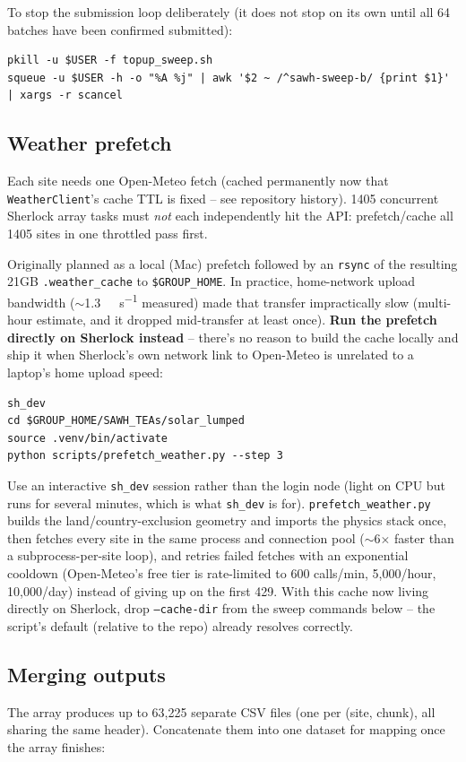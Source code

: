 \documentclass[11pt]{article}
\begin{document}
To stop the submission loop deliberately (it does not stop on its own until all 64 batches have
been confirmed submitted):
\begin{verbatim}
pkill -u $USER -f topup_sweep.sh
squeue -u $USER -h -o "%A %j" | awk '$2 ~ /^sawh-sweep-b/ {print $1}' | xargs -r scancel
\end{verbatim}

\subsection{Weather prefetch}\label{sec:weather}
Each site needs one Open-Meteo fetch (cached permanently now that \texttt{WeatherClient}'s cache
TTL is fixed -- see repository history). 1405 concurrent Sherlock array tasks must \emph{not}
each independently hit the API: prefetch/cache all 1405 sites in one throttled pass first.

Originally planned as a local (Mac) prefetch followed by an \texttt{rsync} of the resulting
21GB \texttt{.weather\_cache} to \texttt{\$GROUP\_HOME}. In practice, home-network upload
bandwidth ($\sim$\SI{1.3}{\mega\byte\per\second} measured) made that transfer impractically
slow (multi-hour estimate, and it dropped mid-transfer at least once). \textbf{Run the prefetch
directly on Sherlock instead} -- there's no reason to build the cache locally and ship it when
Sherlock's own network link to Open-Meteo is unrelated to a laptop's home upload speed:

\begin{verbatim}
sh_dev
cd $GROUP_HOME/SAWH_TEAs/solar_lumped
source .venv/bin/activate
python scripts/prefetch_weather.py --step 3
\end{verbatim}

Use an interactive \texttt{sh\_dev} session rather than the login node (light on CPU but runs
for several minutes, which is what \texttt{sh\_dev} is for). \texttt{prefetch\_weather.py} builds
the land/country-exclusion geometry and imports the physics stack once, then fetches every site
in the same process and connection pool ($\sim$6$\times$ faster than a subprocess-per-site
loop), and retries failed fetches with an exponential cooldown (Open-Meteo's free tier is
rate-limited to 600 calls/min, 5{,}000/hour, 10{,}000/day) instead of giving up on the first 429.
With this cache now living directly on Sherlock, drop \texttt{--cache-dir} from the sweep
commands below -- the script's default (relative to the repo) already resolves correctly.

\subsection{Merging outputs}\label{sec:merge}
The array produces up to 63,225 separate CSV files (one per (site, chunk), all sharing the same
header). Concatenate them into one dataset for mapping once the array finishes:
\end{document}
